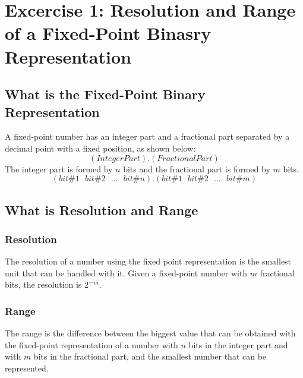 

%



\section{\color{olive}Excercise 1: Resolution and Range of a Fixed-Point Binasry Representation}

\subsection{\color{purple}What is the Fixed-Point Binary Representation}
A fixed-point number has an integer part and a fractional part separated by a decimal point with a fixed position, as shown below:
$$ (Integer Part).(Fractional Part)$$
The integer part is formed by $n$ bits and the fractional part is formed by $m$ bits.
$$ (bit \#1\ \ \ bit \#2\ \ \ ...\ \ \ bit \#n).(bit \#1\ \ \ bit \#2\ \ \ ...\ \ \ bit \#m)$$

\subsection{\color{purple}What is Resolution and Range}
\subsubsection{\color{red}Resolution}
The resolution of a number using the fixed point representation is the smallest unit that can be handled with it.
Given a fixed-point number with $m$ fractional bits, the resolution is $2^- $$^m$. %
\subsubsection{\color{red}Range}
The range is the difference between the biggest value that can be obtained with the fixed-point representation of a number with $n$ bits in the integer part and with $m$ bits in the fractional part, and the smallest number that can be represented.

